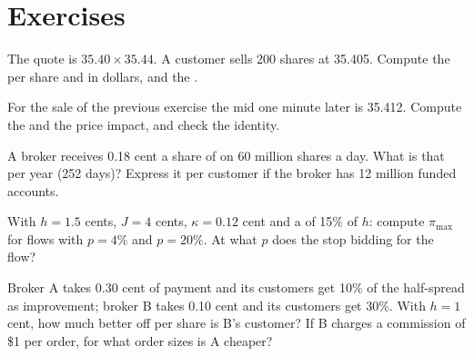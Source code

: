 \section{Exercises}

\begin{exercise}[$\star$]\label{exo:m1:retail-flow-and-wholesaling:1}
The quote is $35.40 \times 35.44$. A customer sells 200 shares at 35.405.
Compute the  per share and in dollars, and the .
\end{exercise}

\begin{exercise}[$\star$]\label{exo:m1:retail-flow-and-wholesaling:2}
For the sale of the previous exercise the mid one minute later is 35.412.
Compute the  and the price impact, and check the
identity.
\end{exercise}

\begin{exercise}[$\star$]\label{exo:m1:retail-flow-and-wholesaling:3}
A broker receives 0.18 cent a share of  on 60 million
shares a day. What is that per year (252 days)? Express it per customer if
the broker has 12 million funded accounts.
\end{exercise}

\begin{exercise}[$\star\star$]\label{exo:m1:retail-flow-and-wholesaling:4}
With $h = 1.5$ cents, $J = 4$ cents, $\kappa = 0.12$ cent and a  of 15\% of $h$: compute $\pi_{\max}$ for flows with $p = 4\%$ and
$p = 20\%$. At what $p$ does the  stop bidding for the flow?
\end{exercise}

\begin{exercise}[$\star\star$]\label{exo:m1:retail-flow-and-wholesaling:5}
Broker A takes 0.30 cent of payment and its customers get 10\% of the
half-spread as improvement; broker B takes 0.10 cent and its customers get
30\%. With $h = 1$ cent, how much better off per share is B's customer? If B
charges a commission of \$1 per order, for what order sizes is A cheaper?
\end{exercise}

